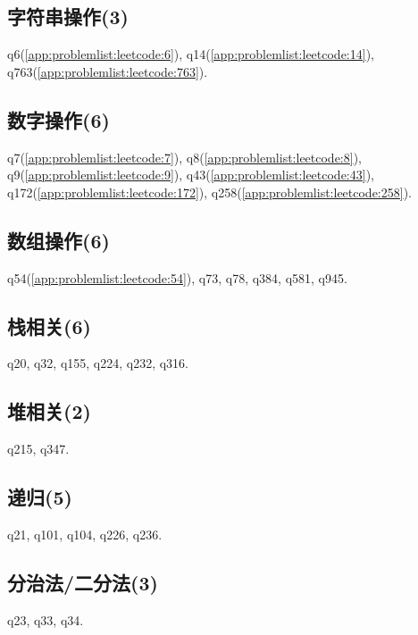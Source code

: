 \subsection{字符串操作(3)}
q6(\ref{app:problemlist:leetcode:6}),
q14(\ref{app:problemlist:leetcode:14}),
q763(\ref{app:problemlist:leetcode:763}).

\subsection{数字操作(6)}
q7(\ref{app:problemlist:leetcode:7}),
q8(\ref{app:problemlist:leetcode:8}),
q9(\ref{app:problemlist:leetcode:9}),
q43(\ref{app:problemlist:leetcode:43}),
q172(\ref{app:problemlist:leetcode:172}),
q258(\ref{app:problemlist:leetcode:258}).

\subsection{数组操作(6)}
q54(\ref{app:problemlist:leetcode:54}),
q73,
q78,
q384,
q581,
q945.

\subsection{栈相关(6)}
q20,
q32,
q155,
q224,
q232,
q316.

\subsection{堆相关(2)}
q215,
q347.

\subsection{递归(5)}
q21,
q101,
q104,
q226,
q236.

\subsection{分治法/二分法(3)}
q23,
q33,
q34.

